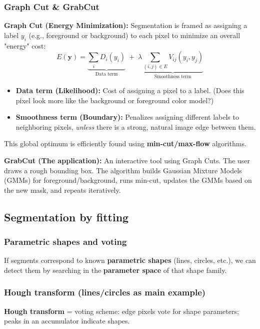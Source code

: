 \documentclass[11pt,a4paper]{article}
\newcommand{\vct}[1]{\bm{#1}}
\begin{document}
\subsubsection{Graph Cut \& GrabCut}

\begin{mathrule}
\textbf{Graph Cut (Energy Minimization):}
Segmentation is framed as assigning a label $y_i$ (e.g., foreground or background) to each pixel to minimize an overall "energy" cost:
\[
E(\vct{y}) = \underbrace{\sum_i D_i(y_i)}_{\text{Data term}} \;+\; \lambda \underbrace{\sum_{(i,j)\in E} V_{ij}(y_i,y_j)}_{\text{Smoothness term}}
\]
\begin{itemize}
  \item \textbf{Data term (Likelihood):} Cost of assigning a pixel to a label. (Does this pixel look more like the background or foreground color model?)
  \item \textbf{Smoothness term (Boundary):} Penalizes assigning different labels to neighboring pixels, \emph{unless} there is a strong, natural image edge between them.
\end{itemize}
This global optimum is efficiently found using \textbf{min-cut/max-flow} algorithms.
\end{mathrule}

\begin{notebox}
\textbf{GrabCut (The application):} An interactive tool using Graph Cuts. The user draws a rough bounding box. The algorithm builds Gaussian Mixture Models (GMMs) for foreground/background, runs min-cut, updates the GMMs based on the new mask, and repeats iteratively.
\end{notebox}


\subsection{Segmentation by fitting}
\subsubsection{Parametric shapes and voting}
\begin{defbox}
If segments correspond to known \textbf{parametric shapes} (lines, circles, etc.),
we can detect them by searching in the \textbf{parameter space} of that shape family.
\end{defbox}

\subsubsection{Hough transform (lines/circles as main example)}
\begin{defbox}
\textbf{Hough transform} = voting scheme: edge pixels vote for shape parameters; peaks in an accumulator indicate shapes.
\end{defbox}
\end{document}
